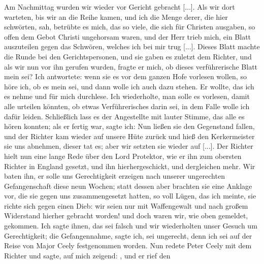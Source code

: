 Am Nachmittag wurden wir wieder vor Gericht
gebracht [...]. Als wir dort warteten, bis wir an die Reihe
kamen, und ich die Menge derer, die hier schwörten, sah, betrübte
es mich, das so viele, die sich für Christen ausgaben, so offen
dem Gebot Christi ungehorsam waren, und der Herr trieb mich,
ein Blatt auszuteilen gegen das Schwören, welches ich bei mir
trug [...].
Dieses Blatt machte die Runde bei den Gerichtspersonen, und
sie gaben es zuletzt dem Richter, und als wir nun vor ihn 
gerufen wurden, fragte er mich, ob dieses verführerische Blatt mein
sei? Ich antwortete: wenn sie es vor dem ganzen Hofe vorlesen
wollen, so höre ich, ob es mein sei, und dann wolle ich auch 
dazu stehen. Er wollte, das ich es nehme und für mich durchlese.
Ich wiederholte, man solle es vorlesen, damit alle urteilen 
könnten,
ob etwas Verführerisches darin sei, in dem Falle wolle ich dafür
leiden. Schließlich lass es der Angestellte mit lauter Stimme, das
alle es hören konnten; als er fertig war, sagte ich:  Nun ließen sie den Gegenstand
fallen, und der Richter kam wieder auf unsere Hüte zurück und
hieß den Kerkermeister sie uns abnehmen, dieser tat es; aber wir
setzten sie wieder auf [...]. Der Richter hielt nun eine lange
Rede über den Lord Protektor, wie er ihn zum obersten Richter
in England gesetzt, und ihn hierhergeschickt, und dergleichen mehr.
Wir baten ihn, er solle uns Gerechtigkeit erzeigen nach unserer
ungerechten Gefangenschaft diese neun Wochen; statt dessen aber
brachten sie eine Anklage vor, die sie gegen uns zusammengesetzt
hatten, so voll Lügen, das ich meinte, sie richte sich gegen einen
Dieb: wir seien nur mit Waffengewalt und nach großem Widerstand 
hierher gebracht worden! und doch waren wir, wie oben
gemeldet, gekommen. Ich sagte ihnen, das sei falsch und wir
wiederholten unser Gesuch um Gerechtigkeit; die Gefangennahme,
sagte ich, sei ungerecht, denn ich sei auf der Reise von Major
Ceely festgenommen worden. Nun redete Peter Ceely mit dem
Richter und sagte, auf mich zeigend: , und er rief den
